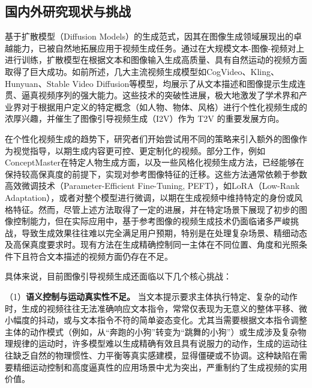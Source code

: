 \subsection{国内外研究现状与挑战}

基于扩散模型（Diffusion Models）\cite{ho2020denoising,song2020denoising,esser2024scaling}的生成范式，因其在图像生成领域展现出的卓越能力，已被自然地拓展应用于视频生成任务。通过在大规模文本-图像-视频对上进行训练，扩散模型在根据文本和图像输入生成高质量、具有自然运动的视频方面取得了巨大成功。如前所述，几大主流视频生成模型如CogVideo\cite{yang2024cogvideox}、Kling\cite{kuaishou2024klingai}、Hunyuan\cite{sun2024hunyuan}、Stable Video Diffusion\cite{blattmann2023stable}等模型，均展示了从文本描述和图像提示生成连贯、逼真视频序列的强大能力。这些技术的突破性进展，极大地激发了学术界和产业界对于根据用户定义的特定概念（如人物、物体、风格）进行个性化视频生成的浓厚兴趣，并催生了图像引导视频生成（I2V）作为 T2V 的重要发展方向。

在个性化视频生成的趋势下，研究者们开始尝试用不同的策略来引入额外的图像作为视觉指导，以期生成内容更可控、更定制化的视频。部分工作，例如ConceptMaster\cite{huang2025conceptmaster}在特定人物生成方面，以及一些风格化视频生成方法\cite{huang2024style}，已经能够在保持较高保真度的前提下，实现对参考图像特征的迁移。这些方法通常依赖于参数高效微调技术（Parameter-Efficient Fine-Tuning, PEFT），如LoRA（Low-Rank Adaptation），或者对整个模型进行微调，以期在生成视频中维持特定的身份或风格特征。然而，尽管上述方法取得了一定的进展，并在特定场景下展现了初步的图像控制能力，但在实际应用中，基于参考图像的视频生成技术仍面临诸多严峻挑战，导致生成效果往往难以完全满足用户预期，特别是在处理复杂场景、精细动态及高保真度要求时。现有方法\cite{kumari2023multi,ruiz2023dreambooth,wei2024dreamvideo,chen2023videodreamer,zhang2024attention,blattmann2023stable}在生成精确控制同一主体在不同位置、角度和光照条件下且符合文本描述的视频方面仍存在不足。

具体来说，目前图像引导视频生成还面临以下几个核心挑战：

（1）\textbf{语义控制与运动真实性不足。} 当文本提示要求主体执行特定、复杂的动作时，生成的视频往往无法准确响应文本指令，常常仅表现为无意义的整体平移、微小幅度的抖动，或与文本指令不符的简单姿态变化。尤其当需要根据文本指令调整主体的动作模式（例如，从“奔跑的小狗”转变为“跳舞的小狗”）或生成涉及复杂物理规律的运动时，许多模型难以生成精确有效且具有说服力的动作，生成的运动往往缺乏自然的物理惯性、力平衡等真实感建模，显得僵硬或不协调。这种缺陷在需要精细运动控制和高度逼真性的应用场景中尤为突出，严重制约了生成视频的实用价值。

